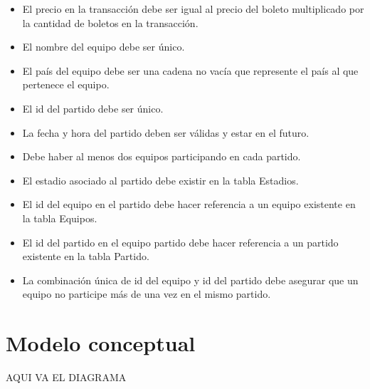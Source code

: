 \begin{itemize}
    \item El precio en la transacción debe ser igual al precio del boleto multiplicado por la cantidad de boletos en la transacción.
    \item El nombre del equipo debe ser único.
    \item El país del equipo debe ser una cadena no vacía que represente el país al que pertenece el equipo.    
    \item El id del partido debe ser único.
    \item La fecha y hora del partido deben ser válidas y estar en el futuro.
    \item Debe haber al menos dos equipos participando en cada partido.
    \item El estadio asociado al partido debe existir en la tabla Estadios.
    \item El id del equipo en el partido debe hacer referencia a un equipo existente en la tabla Equipos.
    \item El id del partido en el equipo partido debe hacer referencia a un partido existente en la tabla Partido.
    \item La combinación única de id del equipo y id del partido debe asegurar que un equipo no participe más de una vez en el mismo partido.
\end{itemize}


\section{Modelo conceptual}

\begin{center}
    AQUI VA EL DIAGRAMA 
\end{center}

